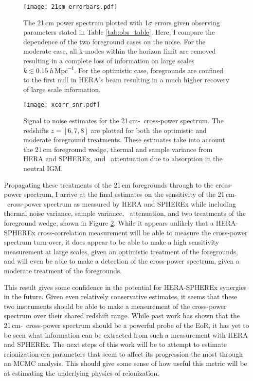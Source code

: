 \begin{figure}[th]
	\centering
	\texttt{[image: 21cm\_errorbars.pdf]}
	\caption[Optimistic vs. Moderate Foreground Treatment]{The 21\,cm power spectrum plotted with 1$\sigma$ errors given
																												 observing parameters stated in Table \ref{tab:obs_table}. Here, I compare the
																												 dependence of the two foreground cases on the noise. For the moderate case,
																												 all k-modes within the horizon limit are removed resulting in a complete loss of information on large scales $k \lesssim 0.15 \ h\,\textrm{Mpc}^{-1}$. For the optimistic case, foregrounds are confined to the first null in HERA's beam resulting in a much higher recovery of large scale information.}
	\label{fig:21cm_errors}
\end{figure}

\begin{figure}[th]
	\centering
	\texttt{[image: xcorr\_snr.pdf]}
	\caption[Cross-Power Spectrum Signal-to-Noise]{Signal to noise estimates for the 21\,cm-\lya\ cross-power spectrum.
	The redshifts $z = [6, 7, 8]$ are plotted for both the optimistic and moderate foreground treatments. These estimates take
	into account the 21\,cm foreground wedge, thermal and sample variance from HERA and SPHEREx, and \lya\ attentuation due to
	absorption in the neutral IGM.}
	\label{fig:snr}
\end{figure}


Propagating these treatments of the 21\,cm foregrounds through to the cross-power spectrum, I arrive
at the final estimates on the sensitivity of the 21\,cm-\lya\ cross-power spectrum as measured
by HERA and SPHEREx while including thermal noise variance, sample variance, \lya\ attenuation,
and two treatments of the foreground wedge, shown in Figure \ref{fig:snr}. While it appears unlikely that a HERA-SPHEREx
cross-correlation measurement will be able to measure the cross-power spectrum turn-over,
it does appear to be able to make a high sensitivity measurement at large scales,
given an optimistic treatment of the foregrounds, and will even be able to make a detection
of the cross-power spectrum, given a moderate treatment of the foregrounds.

This result gives some confidence in the potential for HERA-SPHEREx synergies
in the future. Given even relatively conservative estimates, it seems that these
two instruments should be able to make a measurement of the cross-power spectrum
over their shared redshift range. While past work has shown that the 21\,cm-\lya\
cross-power spectrum should be a powerful probe of the EoR, it has yet to be seen
what information can be extracted from such a measurement with HERA and SPHEREx.
The next steps of this work will be to attempt to estimate reionization-era
parameters that seem to affect its progression the most through an MCMC analysis.
This should give some sense of how useful this metric will be at estimating the
underlying physics of reionization.
